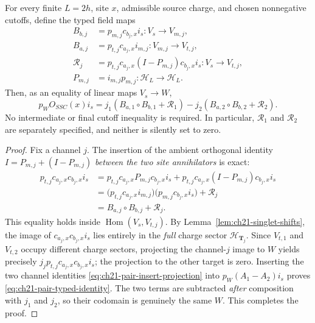 \begin{theorem}
\label{thm:ch21-pair-projected}
For every finite \(L=2h\), site \(x\), admissible source charge,
and chosen nonnegative cutoffs, define the typed field maps
\begin{equation}
 \begin{aligned}
 B_{b,j}&=p_{m,j}c_{b_j,x}i_s:
                  V_s\longrightarrow V_{m,j},\\
 B_{a,j}&=p_{t,j}c_{a_j,x}i_{m,j}:
                  V_{m,j}\longrightarrow V_{t,j},\\
 \mathcal R_j&=p_{t,j}c_{a_j,x}
       (I-P_{m,j})c_{b_j,x}i_s:
                  V_s\longrightarrow V_{t,j},\\
 P_{m,j}&=i_{m,j}p_{m,j}:
                  \mathcal H_L\longrightarrow\mathcal H_L.
 \end{aligned}
 \label{eq:ch21-pair-typed-maps}
\end{equation}
Then, as an equality of linear maps \(V_s\longrightarrow W\),
\begin{equation}
 \boxed{\displaystyle
 p_W O_{SSC}(x)i_s
  =j_1\!\left(B_{a,1}\circ B_{b,1}+\mathcal R_1\right)
   -j_2\!\left(B_{a,2}\circ B_{b,2}+\mathcal R_2\right).}
 \label{eq:ch21-pair-typed-identity}
\end{equation}
No intermediate or final cutoff inequality is required.  In
particular, \(\mathcal R_1\) and \(\mathcal R_2\) are separately
specified, and neither is silently set to zero.
\end{theorem}

\begin{proof}
Fix a channel \(j\).  The insertion of the ambient orthogonal
identity \(I=P_{m,j}+(I-P_{m,j})\) \emph{between the two site
annihilators} is exact:
\begin{equation}
 \begin{aligned}
 p_{t,j}c_{a_j,x}c_{b_j,x}i_s
 &=p_{t,j}c_{a_j,x}
       P_{m,j}c_{b_j,x}i_s
   +p_{t,j}c_{a_j,x}(I-P_{m,j})c_{b_j,x}i_s\\
 &=\bigl(p_{t,j}c_{a_j,x}i_{m,j}\bigr)
       \bigl(p_{m,j}c_{b_j,x}i_s\bigr)
      +\mathcal R_j\\
 &=B_{a,j}\circ B_{b,j}+\mathcal R_j.
 \end{aligned}
 \label{eq:ch21-pair-insert-projection}
\end{equation}
This equality holds inside \(\operatorname{Hom}(V_s,V_{t,j})\).
By Lemma~\ref{lem:ch21-singlet-shifts}, the image of
\(c_{a_j,x}c_{b_j,x}i_s\) lies entirely in the
\emph{full} charge sector \(\mathcal H_{\mathbf T_j}\).
Since \(V_{t,1}\) and \(V_{t,2}\) occupy different charge sectors,
projecting the channel-\(j\) image to \(W\) yields precisely
\(j_jp_{t,j}c_{a_j,x}c_{b_j,x}i_s\); the projection to the other
target is zero.  Inserting the two channel identities
\eqref{eq:ch21-pair-insert-projection} into
\(p_W(A_1-A_2)i_s\) proves
\eqref{eq:ch21-pair-typed-identity}.  The two terms are subtracted
\emph{after} composition with \(j_1\) and \(j_2\), so their
codomain is genuinely the same \(W\).  This completes the proof.
\end{proof}

